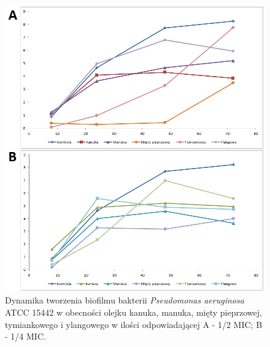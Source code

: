 \documentclass[11pt,a4paper]{report}
\begin{document}
\begin{figure}[!h]
\begin{center}
\includegraphics[scale=0.7]{img/ref-b.png}
\caption{Dynamika tworzenia biofilmu bakterii \textit{Pseudomonas aeruginosa} ATCC 15442 w obecności olejku kanuka, manuka, mięty pieprzowej, tymiankowego i ylangowego w ilości odpowiadającej A - 1/2 MIC; B - 1/4 MIC.}\label{ref-b}
\end{center} 
\end{figure}
\end{document}
